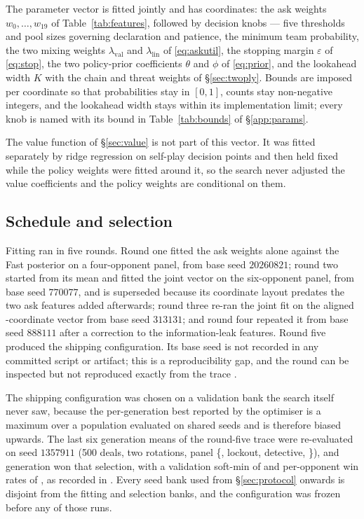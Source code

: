 The parameter vector is fitted jointly and has \numParams{} coordinates: the
\numAskFeats{} ask weights $w_0,\dots,w_{19}$ of Table~\ref{tab:features},
followed by \numKnobs{} decision knobs --- five thresholds and pool sizes
governing declaration and patience, the minimum team probability, the two mixing
weights $\lambda_{\mathrm{val}}$ and $\lambda_{\mathrm{lin}}$ of
\eqref{eq:askutil}, the stopping margin $\varepsilon$ of \eqref{eq:stop}, the two
policy-prior coefficients $\theta$ and $\phi$ of \eqref{eq:prior}, and the
lookahead width $K$ with the chain and threat weights of \S\ref{sec:twoply}.
Bounds are imposed per coordinate so that probabilities stay in $[0,1]$, counts
stay non-negative integers, and the lookahead width stays within its
implementation limit; every knob is named with its bound in
Table~\ref{tab:bounds} of \S\ref{app:params}.

The value function of \S\ref{sec:value} is not part of this vector. It was fitted
separately by ridge regression on self-play decision points and then held fixed
while the policy weights were fitted around it, so the search never adjusted the
value coefficients and the policy weights are conditional on them.

\subsection{Schedule and selection}

Fitting ran in five rounds. Round one fitted the \numAskFeats{} ask weights alone
against the Fast posterior on a four-opponent panel, from base seed $20260821$;
round two started from its mean and fitted the joint vector on the six-opponent
panel, from base seed $770077$, and is superseded because its coordinate layout
predates the two ask features added afterwards; round three re-ran the joint fit
on the aligned \numParams{}-coordinate vector from base seed $313131$; and round
four repeated it from base seed $888111$ after a correction to the
information-leak features. Round five produced the shipping configuration. Its
base seed is not recorded in any committed script or artifact; this is a
reproducibility gap, and the round can be inspected but not reproduced exactly
from the trace .

The shipping configuration was chosen on a validation bank the search itself
never saw, because the per-generation best reported by the optimiser is a maximum
over a population evaluated on shared seeds and is therefore biased upwards. The
last six generation means of the round-five trace were re-evaluated on seed
$1357911$ (500 deals, two rotations, panel \{\vthree{}, lockout, detective,
\vtwo{}\}), and generation \numSelectedGen{} won that selection, with a
validation soft-min of \numSelectSoftmin{} and per-opponent win rates of
\numSelectPerOpp{}, as recorded in .
Every seed bank used from \S\ref{sec:protocol} onwards is disjoint from the
fitting and selection banks, and the configuration was frozen before any of those
runs.

